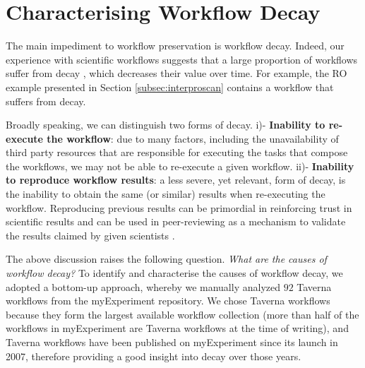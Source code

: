 \section{Characterising Workflow Decay}
\label{sec:decay}

The main impediment to workflow preservation is workflow decay. Indeed, our experience with scientific workflows suggests that a large proportion of workflows suffer from decay \cite{DBLP:conf/eScience/Belhajjame07}, which decreases their value over time. For example, the RO example presented in Section \ref{subsec:interproscan} contains a workflow that suffers from decay.

Broadly speaking, we can distinguish two forms of decay. i)- {\bf Inability to re-execute the workflow}: due to many factors, including the unavailability of third party resources that are responsible for executing the tasks that compose the workflows, we may not be able to re-execute a given workflow. ii)- {\bf Inability to reproduce workflow results}: a less severe, yet relevant, form of decay, is the inability to obtain the same (or similar) results when re-executing the workflow. Reproducing previous results can be primordial in reinforcing trust in scientific results and can be used in peer-reviewing as a mechanism to validate the results claimed by given scientists \cite{DBLP:journals/pvldb/FreireBS11,carole2011}. 

The above discussion raises the following question. {\em What are the causes of workflow decay?} To identify and characterise the causes of workflow decay, we adopted a bottom-up approach, whereby we manually analyzed $92$ Taverna workflows from the myExperiment repository. We chose Taverna workflows because they form the largest available workflow collection (more than half of the workflows in myExperiment are Taverna workflows at the time of writing), and Taverna workflows have been published on myExperiment since its launch in 2007, therefore providing a good insight into decay over those years. 

